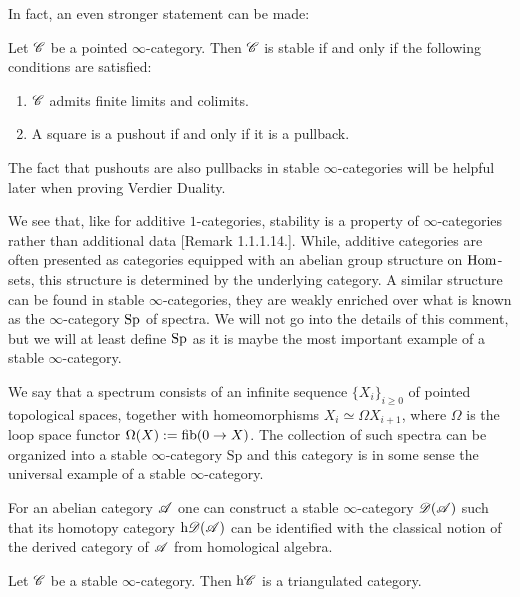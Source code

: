 \documentclass[../../thesis.tex]{subfiles}
\begin{document}
In fact, an even stronger statement can be made:
\begin{proposition}
    Let $\mathscr{C}$ be a pointed $\infty$-category.
    Then $\mathscr{C}$ is stable if and only if the following conditions are satisfied:
    \begin{enumerate}
        \item $\mathscr{C}$ admits finite limits and colimits.
        \item A square is a pushout if and only if it is a pullback.
    \end{enumerate}
\end{proposition}
The fact that pushouts are also pullbacks in stable $\infty$-categories will be helpful later when proving Verdier Duality.


We see that, like for additive $1$-categories, stability is a property of $\infty$-categories rather than additional data \cite{HA}[Remark 1.1.1.14.].
While, additive categories are often presented as categories equipped with an abelian group structure on $\mathrm{Hom}$-sets, this structure is determined by the underlying category.
A similar structure can be found in stable $\infty$-categories, they are weakly enriched over what is known as the $\infty$-category $\mathrm{Sp}$ of spectra.
We will not go into the details of this comment, but we will at least define $\mathrm{Sp}$ as it is maybe the most important example of a stable $\infty$-category.
\begin{example}[{\cite[Example 1.1.1.11.]{HA}}]
    We say that a spectrum consists of an infinite sequence $\{X_i\}_{i \geq 0}$ of pointed topological spaces, together with homeomorphisms $X_i \simeq \Omega X_{i+1}$, where $\Omega$ is the loop space functor $\Omega(X) : = \operatorname{fib}(0 \to X)$.
    The collection of such spectra can be organized into a stable $\infty$-category $\mathrm{Sp}$ and this category is in some sense the universal example of a stable $\infty$-category.
\end{example}
\begin{example}[{\cite[Example 1.1.1.12.]{HA}}]
    For an abelian category $\mathscr{A}$ one can construct a stable $\infty$-category $\mathscr{D}(\mathscr{A})$ such that its homotopy category $\mathrm{h}\mathscr{D}(\mathscr{A})$ can be identified with the classical notion of the derived category of $\mathscr{A}$ from homological algebra.
\end{example}
\begin{theorem}[{\cite[Theorem 1.1.2.14.]{HA}}]
    Let $\mathscr{C}$ be a stable $\infty$-category.
    Then $\mathrm{h}\mathscr{C}$ is a triangulated category.
\end{theorem}
\end{document}

